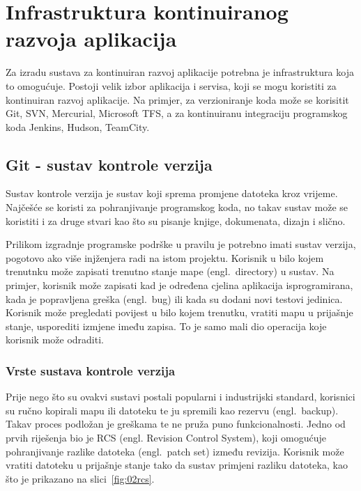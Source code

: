 \chapter{Infrastruktura kontinuiranog razvoja aplikacija}
Za izradu sustava za kontinuiran razvoj aplikacije potrebna je infrastruktura koja to omogućuje.
Postoji velik izbor aplikacija i servisa, koji se mogu koristiti za kontinuiran razvoj aplikacije.
Na primjer, za verzioniranje koda može se korisitit Git, SVN, Mercurial, Microsoft TFS, a za
kontinuiranu integraciju programskog koda Jenkins, Hudson, TeamCity.

\section{Git - sustav kontrole verzija}
Sustav kontrole verzija je sustav koji sprema promjene datoteka kroz vrijeme. Najčešće se koristi za
pohranjivanje programskog koda, no takav sustav može se koristiti i za druge stvari kao što su
pisanje knjige, dokumenata, dizajn i slično.

Prilikom izgradnje programske podrške u pravilu je potrebno imati sustav verzija, pogotovo ako više
injženjera radi na istom projektu. Korisnik u bilo kojem trenutnku može zapisati trenutno stanje
mape (engl.~directory) u sustav. Na primjer, korisnik može zapisati kad je određena cjelina
aplikacija isprogramirana, kada je popravljena greška (engl.~bug) ili kada su dodani novi testovi
jedinica. Korisnik može pregledati povijest u bilo kojem trenutku, vratiti mapu u prijašnje stanje,
usporediti izmjene imeđu zapisa. To je samo mali dio operacija koje korisnik može odraditi.

\subsection{Vrste sustava kontrole verzija}
Prije nego što su ovakvi sustavi postali popularni i industrijski standard, korisnici su ručno
kopirali mapu ili datoteku te ju spremili kao rezervu (engl.~backup). Takav proces podložan je
greškama te ne pruža puno funkcionalnosti. Jedno od prvih riješenja bio je RCS (engl. Revision
Control System)\citep{chacon2014pro}, koji omogućuje pohranjivanje razlike datoteka (engl.~patch
set) između revizija. Korisnik može vratiti datoteku u prijašnje stanje tako da sustav primjeni
razliku datoteka, kao što
je prikazano na slici~\ref{fig:02rcs}.

